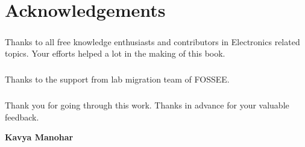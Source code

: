 \chapter*{Acknowledgements}
\paragraph{}

Thanks to all free knowledge enthusiasts and contributors in Electronics related topics. Your efforts helped a lot in the making of this book.
\paragraph{}

Thanks to the support from lab migration team of FOSSEE.
\paragraph{}

Thank you for going through this work. Thanks in advance for your valuable feedback.

\begin{flushright}
\textbf{Kavya Manohar}
\end{flushright}

